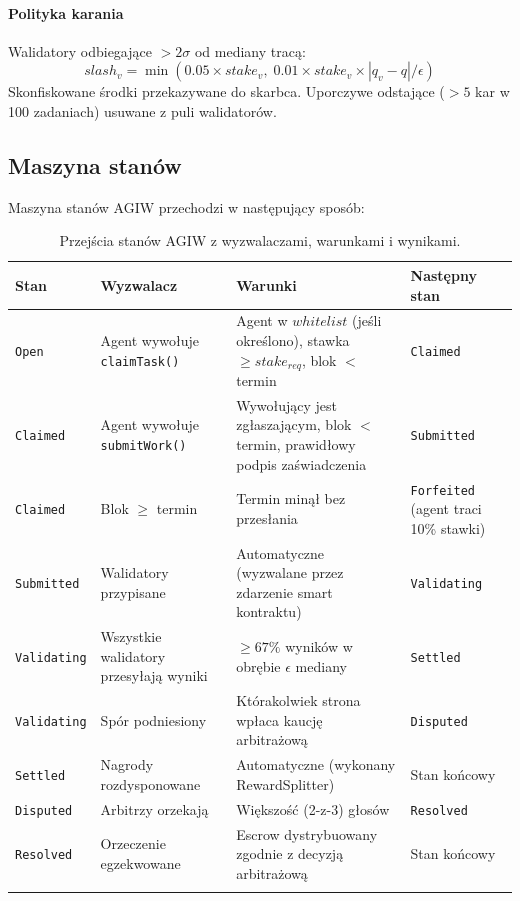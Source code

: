 \documentclass[11pt]{article}
\begin{document}
\paragraph{Polityka karania} Walidatory odbiegające $>2\sigma$ od mediany tracą:
\begin{equation}
slash_v = \min(0.05 \times stake_v, \; 0.01 \times stake_v \times |q_v - q| / \epsilon)
\end{equation}
Skonfiskowane środki przekazywane do skarbca. Uporczywe odstające ($>5$ kar w 100 zadaniach) usuwane z puli walidatorów.

\subsection{Maszyna stanów}
\label{sec:agiw-state-machine}
Maszyna stanów AGIW przechodzi w następujący sposób:
\begin{longtable}{@{}p{}p{}p{}p{}@{}}
\toprule
\textbf{Stan} & \textbf{Wyzwalacz} & \textbf{Warunki} & \textbf{Następny stan} \\\midrule
\texttt{Open} & Agent wywołuje \texttt{claimTask()} & Agent w $whitelist$ (jeśli określono), stawka $\geq stake_{req}$, blok $<$ termin & \texttt{Claimed} \\
\texttt{Claimed} & Agent wywołuje \texttt{submitWork()} & Wywołujący jest zgłaszającym, blok $<$ termin, prawidłowy podpis zaświadczenia & \texttt{Submitted} \\
\texttt{Claimed} & Blok $\geq$ termin & Termin minął bez przesłania & \texttt{Forfeited} (agent traci 10\% stawki) \\
\texttt{Submitted} & Walidatory przypisane & Automatyczne (wyzwalane przez zdarzenie smart kontraktu) & \texttt{Validating} \\
\texttt{Validating} & Wszystkie walidatory przesyłają wyniki & $\geq 67\%$ wyników w obrębie $\epsilon$ mediany & \texttt{Settled} \\
\texttt{Validating} & Spór podniesiony & Którakolwiek strona wpłaca kaucję arbitrażową & \texttt{Disputed} \\
\texttt{Settled} & Nagrody rozdysponowane & Automatyczne (wykonany RewardSplitter) & Stan końcowy \\
\texttt{Disputed} & Arbitrzy orzekają & Większość (2-z-3) głosów & \texttt{Resolved} \\
\texttt{Resolved} & Orzeczenie egzekwowane & Escrow dystrybuowany zgodnie z decyzją arbitrażową & Stan końcowy \\\bottomrule
\caption{Przejścia stanów AGIW z wyzwalaczami, warunkami i wynikami.}
\label{tab:agiw-states}
\end{longtable}
\end{document}
